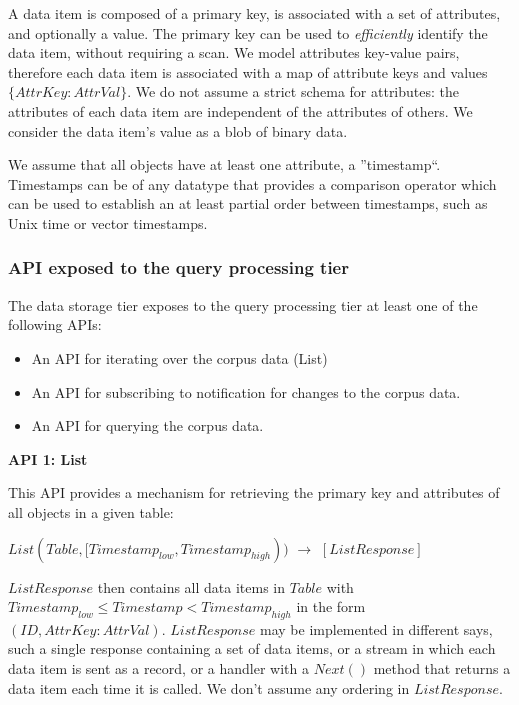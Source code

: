 A data item is composed of a primary key, is associated with a set of attributes, and optionally a value.
The primary key can be used to \textit{efficiently} identify the data item, without requiring a scan.
We model attributes key-value pairs, therefore each data item is associated with a map of attribute keys and values
$\{AttrKey: AttrVal\}$.
We do not assume a strict schema for attributes: the attributes of each data item are independent of the attributes of
others.
We consider the data item's value as a blob of binary data.

We assume that all objects have at least one attribute, a ''timestamp``.
Timestamps can be of any datatype that provides a comparison operator which can be used to establish an at least partial
order between timestamps, such as Unix time or vector timestamps.

\subsubsection{API exposed to the query processing tier}

The data storage tier exposes to the query processing tier at least one of the following APIs:
\begin{itemize}
  \item An API for iterating over the corpus data (List)
  \item An API for subscribing to notification for changes to the corpus data.
  \item An API for querying the corpus data.
\end{itemize}

\noindent
\textbf{API 1: List}

\noindent
This API provides a mechanism for retrieving the primary key and attributes of all objects in a given table:

$List(Table, [Timestamp_{low}, Timestamp_{high}))$ $\rightarrow$ $[ListResponse]$

\noindent
$ListResponse$ then contains all data items in $Table$ with $Timestamp_{low} \leq Timestamp < Timestamp_{high}$
in the form $(ID, {AttrKey: AttrVal})$.
$ListResponse$ may be implemented in different says, such a single response containing a set of
data items, or a stream in which each data item is sent as a record, or a handler with a $Next()$ method that returns a
data item each time it is called.
We don't assume any ordering in $ListResponse$.


